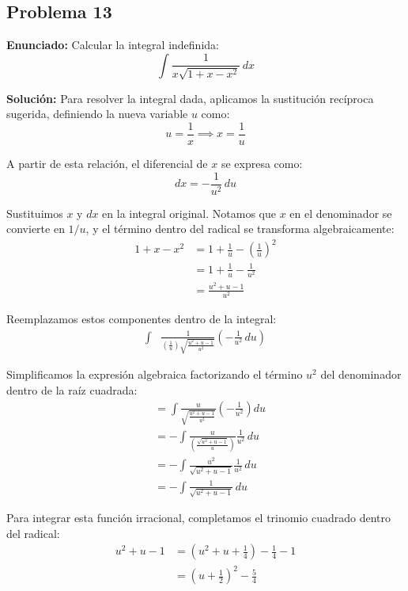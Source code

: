 \subsection*{Problema 13}

\textbf{Enunciado:} 
Calcular la integral indefinida:
\begin{equation*}
\int \frac{1}{x \sqrt{1 + x - x^2}} \, dx
\end{equation*}

\textbf{Solución:} 
Para resolver la integral dada, aplicamos la 
sustitución recíproca sugerida, definiendo 
la nueva variable $u$ como:
\begin{equation*}
u = \frac{1}{x} \implies x = \frac{1}{u}
\end{equation*}

A partir de esta relación, el diferencial 
de $x$ se expresa como:
\begin{equation*}
dx = -\frac{1}{u^2} \, du
\end{equation*}

Sustituimos $x$ y $dx$ en la integral 
original. Notamos que $x$ en el denominador 
se convierte en $1/u$, y el término dentro 
del radical se transforma algebraicamente:
\begin{align*}
1 + x - x^2 &= 1 + \frac{1}{u} - \left(\frac{1}{u}\right)^2 \\
&= 1 + \frac{1}{u} - \frac{1}{u^2} \\
&= \frac{u^2 + u - 1}{u^2}
\end{align*}

Reemplazamos estos componentes 
dentro de la integral:
\begin{align*}
\int &\frac{1}{\left(\frac{1}{u}\right) 
\sqrt{\frac{u^2 + u - 1}{u^2}}} 
\left(-\frac{1}{u^2} \, du\right)
\end{align*}

Simplificamos la expresión algebraica 
factorizando el término $u^2$ del denominador 
dentro de la raíz cuadrada:
\begin{align*}
&= \int \frac{u}{\sqrt{\frac{u^2 + u - 1}{u^2}}} 
\left(-\frac{1}{u^2}\right) du \\
&= -\int \frac{u}{\left(\frac{\sqrt{u^2 + u - 1}}{u}\right)} 
\frac{1}{u^2} \, du \\
&= -\int \frac{u^2}{\sqrt{u^2 + u - 1}} 
\frac{1}{u^2} \, du \\
&= -\int \frac{1}{\sqrt{u^2 + u - 1}} \, du
\end{align*}

Para integrar esta función irracional, 
completamos el trinomio cuadrado 
dentro del radical:
\begin{align*}
u^2 + u - 1 &= \left(u^2 + u + \frac{1}{4}\right) 
- \frac{1}{4} - 1 \\
&= \left(u + \frac{1}{2}\right)^2 - \frac{5}{4}
\end{align*}

